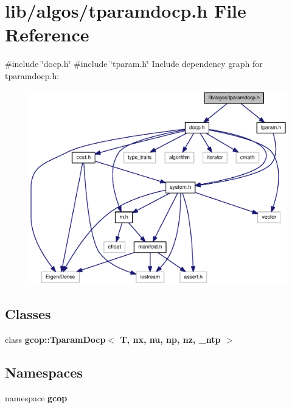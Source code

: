 \section{lib/algos/tparamdocp.h \-File \-Reference}
\label{tparamdocp_8h}
{\ttfamily \#include \char`\"{}docp.\-h\char`\"{}}\*
{\ttfamily \#include \char`\"{}tparam.\-h\char`\"{}}\*
\-Include dependency graph for tparamdocp.\-h\-:\nopagebreak
\begin{figure}[H]
\begin{center}
\leavevmode
\includegraphics[width=350pt]{tparamdocp_8h__incl}
\end{center}
\end{figure}
\subsection*{\-Classes}
\begin{DoxyCompactItemize}
\item 
class {\bf gcop\-::\-Tparam\-Docp$<$ T, nx, nu, np, nz, \-\_\-ntp $>$}
\end{DoxyCompactItemize}
\subsection*{\-Namespaces}
\begin{DoxyCompactItemize}
\item 
namespace {\bf gcop}
\end{DoxyCompactItemize}

